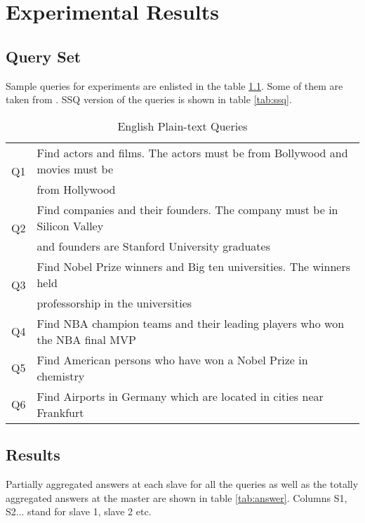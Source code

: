 \documentclass[11pt]{report}
\begin{document}

\chapter{Experimental Results}

\section{Query Set}
Sample queries for experiments are enlisted in the table \ref{tab:english}. Some of them are taken from \cite{ssq}.
SSQ version of the  queries is shown in table \ref{tab:ssq}.
\begin{table}[htbp]
\begin{center}
\caption{English Plain-text Queries}
\label{tab:english}
\begin{tabular}{|l|l|}
\hline
\multirow{2}{*}{Q1} & Find actors and films. The actors must be from Bollywood and movies must be \\
 & from Hollywood\\
\hline
\multirow{2}{*}{Q2} & Find companies and their founders. The company must be in Silicon Valley  \\
 & and founders are Stanford University graduates \\
\hline
\multirow{2}{*}{Q3} & Find Nobel Prize winners and Big ten universities. The winners held   \\
 & professorship in the universities \\
\hline
 Q4 & Find NBA champion teams and their leading players who won the NBA final MVP   \\
\hline
 Q5 & Find American persons who have won a Nobel Prize in chemistry   \\
\hline
 Q6 & Find Airports in Germany which are located in cities near Frankfurt   \\
\hline
\end{tabular}
\end{center}
\end{table}

\section{Results}
Partially aggregated answers at each slave for all the queries as well as the totally aggregated answers at the master
are shown in table \ref{tab:answer}. Columns S1, S2... stand for slave 1, slave 2 etc.
\end{document}
